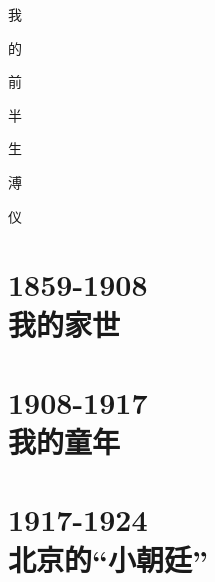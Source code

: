 \documentclass[oneside,openright,headings=optiontohead]{scrbook}
\begin{document}
\begin{figure}[ht]
\begin{center}

\end{center}
\end{figure}
\newpage
\begin{flushright}
{\Huge 我}

{\Huge 的}

{\Huge 前}

{\Huge 半}

{\Huge 生}

\vspace{1cm}

{\LARGE 溥}

{\LARGE 仪}
\end{flushright}
\newpage
{\color{TEXTColor}
\tableofcontents
\thispagestyle{empty}
\newpage
\part{1859-1908\\\hspace{1cm}我的家世}
\begin{multicols}{2}





\end{multicols}
\part{1908-1917\\\hspace{1cm}我的童年}
\begin{multicols}{2}






\end{multicols}
\part{1917-1924\\\hspace{1cm}北京的“小朝廷”}
\begin{multicols}{2}













\end{multicols}
}
\end{document}
